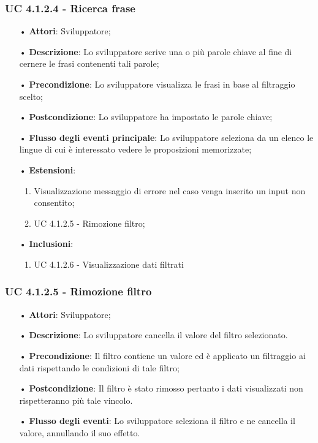 \subsubsection{UC 4.1.2.4 - Ricerca frase}
\begin{itemize}
\item[•]\textbf{Attori}: Sviluppatore;
\item[•]\textbf{Descrizione}: Lo sviluppatore scrive una o più parole chiave al fine di cernere le frasi contenenti tali parole;
\item[•]\textbf{Precondizione}: Lo sviluppatore visualizza le frasi in base al filtraggio scelto;
\item[•]\textbf{Postcondizione}: Lo sviluppatore ha impostato le parole chiave;
\item[•]\textbf{Flusso degli eventi principale}: Lo sviluppatore seleziona da un elenco le lingue di cui è interessato vedere le proposizioni memorizzate;
\item[•]\textbf{Estensioni}: 
\begin{enumerate}
	\item Visualizzazione messaggio di errore nel caso venga inserito un input non consentito;
	\item UC 4.1.2.5 - Rimozione filtro;
\end{enumerate}
\item[•]\textbf{Inclusioni}:
\begin{enumerate}
\item UC 4.1.2.6 - Visualizzazione dati filtrati
\end{enumerate}
\end{itemize}

\subsubsection{UC 4.1.2.5 - Rimozione filtro}
\begin{itemize}
\item[•]\textbf{Attori}: Sviluppatore;
\item[•]\textbf{Descrizione}: Lo sviluppatore cancella il valore del filtro selezionato.
\item[•]\textbf{Precondizione}: Il filtro contiene un valore ed è applicato un filtraggio ai dati rispettando le condizioni di tale filtro;
\item[•]\textbf{Postcondizione}: Il filtro è stato rimosso pertanto i dati visualizzati non rispetteranno più tale vincolo.
\item[•]\textbf{Flusso degli eventi}: Lo sviluppatore seleziona il filtro e ne cancella il valore, annullando il suo effetto.
\end{itemize}

